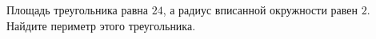 \begin{ex}
	\begin{condition}
		Площадь треугольника равна \( 24 \), а радиус вписанной окружности равен \( 2 \). Найдите периметр этого треугольника.
	\end{condition}
\end{ex}